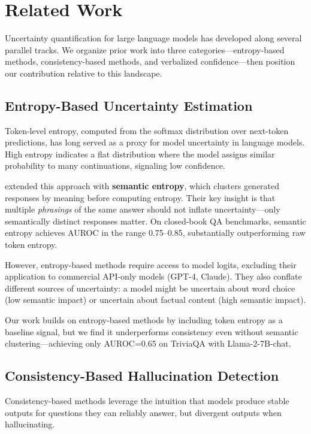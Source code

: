 \section{Related Work}

Uncertainty quantification for large language models has developed along several parallel tracks. We organize prior work into three categories---entropy-based methods, consistency-based methods, and verbalized confidence---then position our contribution relative to this landscape.

\subsection{Entropy-Based Uncertainty Estimation}

Token-level entropy, computed from the softmax distribution over next-token predictions, has long served as a proxy for model uncertainty in language models. High entropy indicates a flat distribution where the model assigns similar probability to many continuations, signaling low confidence.

\citet{kuhn2023semantic} extended this approach with \textbf{semantic entropy}, which clusters generated responses by meaning before computing entropy. Their key insight is that multiple \emph{phrasings} of the same answer should not inflate uncertainty---only semantically distinct responses matter. On closed-book QA benchmarks, semantic entropy achieves AUROC in the range 0.75--0.85, substantially outperforming raw token entropy.

However, entropy-based methods require access to model logits, excluding their application to commercial API-only models (GPT-4, Claude). They also conflate different sources of uncertainty: a model might be uncertain about word choice (low semantic impact) or uncertain about factual content (high semantic impact).

Our work builds on entropy-based methods by including token entropy as a baseline signal, but we find it underperforms consistency even without semantic clustering---achieving only AUROC=0.65 on TriviaQA with Llama-2-7B-chat.

\subsection{Consistency-Based Hallucination Detection}

Consistency-based methods leverage the intuition that models produce stable outputs for questions they can reliably answer, but divergent outputs when hallucinating.

